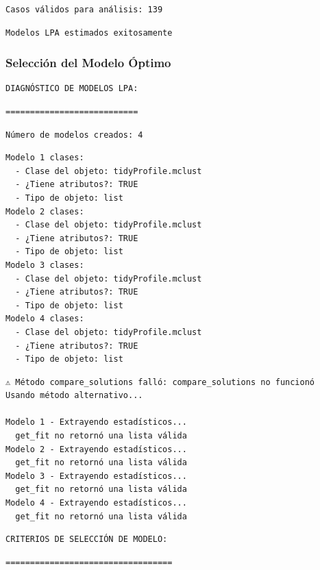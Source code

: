 \documentclass[
  11pt,
  letterpaper,
  DIV=11,
  numbers=noendperiod]{scrartcl}
\begin{document}
\begin{verbatim}
Casos válidos para análisis: 139 
\end{verbatim}

\begin{verbatim}
Modelos LPA estimados exitosamente
\end{verbatim}

\subsubsection{Selección del Modelo
Óptimo}\label{selecciuxf3n-del-modelo-uxf3ptimo}

\begin{verbatim}
DIAGNÓSTICO DE MODELOS LPA:
\end{verbatim}

\begin{verbatim}
===========================
\end{verbatim}

\begin{verbatim}
Número de modelos creados: 4 
\end{verbatim}

\begin{verbatim}
Modelo 1 clases:
  - Clase del objeto: tidyProfile.mclust 
  - ¿Tiene atributos?: TRUE 
  - Tipo de objeto: list 
Modelo 2 clases:
  - Clase del objeto: tidyProfile.mclust 
  - ¿Tiene atributos?: TRUE 
  - Tipo de objeto: list 
Modelo 3 clases:
  - Clase del objeto: tidyProfile.mclust 
  - ¿Tiene atributos?: TRUE 
  - Tipo de objeto: list 
Modelo 4 clases:
  - Clase del objeto: tidyProfile.mclust 
  - ¿Tiene atributos?: TRUE 
  - Tipo de objeto: list 
\end{verbatim}

\begin{verbatim}
⚠ Método compare_solutions falló: compare_solutions no funcionó 
Usando método alternativo...

Modelo 1 - Extrayendo estadísticos...
  get_fit no retornó una lista válida
Modelo 2 - Extrayendo estadísticos...
  get_fit no retornó una lista válida
Modelo 3 - Extrayendo estadísticos...
  get_fit no retornó una lista válida
Modelo 4 - Extrayendo estadísticos...
  get_fit no retornó una lista válida
\end{verbatim}

\begin{verbatim}
CRITERIOS DE SELECCIÓN DE MODELO:
\end{verbatim}

\begin{verbatim}
==================================
\end{verbatim}
\end{document}
